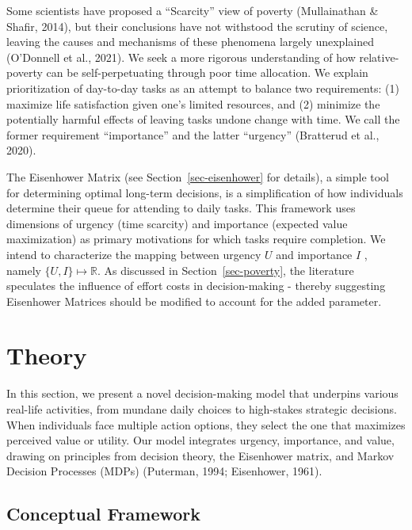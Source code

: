 \documentclass[
]{report}
\begin{document}
Some scientists have proposed a ``Scarcity'' view of poverty
(Mullainathan \& Shafir, 2014), but their conclusions have not withstood
the scrutiny of science, leaving the causes and mechanisms of these
phenomena largely unexplained (O'Donnell et al., 2021). We seek a more
rigorous understanding of how relative-poverty can be self-perpetuating
through poor time allocation. We explain prioritization of day-to-day
tasks as an attempt to balance two requirements: (1) maximize life
satisfaction given one's limited resources, and (2) minimize the
potentially harmful effects of leaving tasks undone change with time. We
call the former requirement ``importance'' and the latter ``urgency''
(Bratterud et al., 2020).

The Eisenhower Matrix (see Section~\ref{sec-eisenhower} for details), a
simple tool for determining optimal long-term decisions, is a
simplification of how individuals determine their queue for attending to
daily tasks. This framework uses dimensions of urgency (time scarcity)
and importance (expected value maximization) as primary motivations for
which tasks require completion. We intend to characterize the mapping
between urgency \(U\) and importance \(I\) , namely
\(\{ U,I \} \mapsto \mathbb{R}\). As discussed in
Section~\ref{sec-poverty}, the literature speculates the influence of
effort costs in decision-making - thereby suggesting Eisenhower Matrices
should be modified to account for the added parameter.

\hypertarget{theory}{%
\chapter{Theory}\label{theory}}

In this section, we present a novel decision-making model that underpins
various real-life activities, from mundane daily choices to high-stakes
strategic decisions. When individuals face multiple action options, they
select the one that maximizes perceived value or utility. Our model
integrates urgency, importance, and value, drawing on principles from
decision theory, the Eisenhower matrix, and Markov Decision Processes
(MDPs) (Puterman, 1994; Eisenhower, 1961).

\hypertarget{conceptual-framework}{%
\section{Conceptual Framework}\label{conceptual-framework}}
\end{document}
